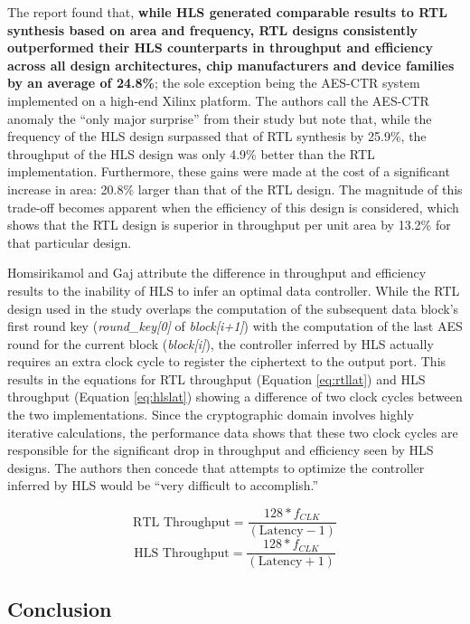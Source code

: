 \documentclass[12pt,journal,compsoc,onecolumn]{IEEEtran}
\begin{document}
The report found that, \textbf{while HLS generated comparable results to RTL synthesis based on area and frequency, RTL designs consistently outperformed their HLS counterparts in throughput and efficiency across all design architectures, chip manufacturers and device families by an average of 24.8\%}; the sole exception being the AES-CTR system implemented on a high-end Xilinx platform. The authors call the AES-CTR anomaly the ``only major surprise'' from their study but note that, while the frequency of the HLS design surpassed that of RTL synthesis by 25.9\%, the throughput of the HLS design was only 4.9\% better than the RTL implementation. Furthermore, these gains were made at the cost of a significant increase in area: 20.8\% larger than that of the RTL design. The magnitude of this trade-off becomes apparent when the efficiency of this design is considered, which shows that the RTL design is superior in throughput per unit area by 13.2\% for that particular design.

Homsirikamol and Gaj attribute the difference in throughput and efficiency results to the inability of HLS to infer an optimal data controller. While the RTL design used in the study overlaps the computation of the subsequent data block's first round key (\emph{round\_key[0]} of \emph{block[i+1]}) with the computation of the last AES round for the current block (\emph{block[i]}), the controller inferred by HLS actually requires an extra clock cycle to register the ciphertext to the output port. This results in the equations for RTL throughput (Equation \ref{eq:rtllat}) and HLS throughput (Equation \ref{eq:hlslat}) showing a difference of two clock cycles between the two implementations. Since the cryptographic domain involves highly iterative calculations, the performance data shows that these two clock cycles are responsible for the significant drop in throughput and efficiency seen by HLS designs. The authors then concede that attempts to optimize the controller inferred by HLS would be ``very difficult to accomplish.''

\begin{equation}\label{eq:rtllat}
	\text{RTL Throughput}=\frac{128*f_{CLK}}{(\text{Latency}-1)}
\end{equation}
\begin{equation}\label{eq:hlslat}
	\text{HLS Throughput}=\frac{128*f_{CLK}}{(\text{Latency}+1)}
\end{equation}

\subsection{Conclusion}
\end{document}
